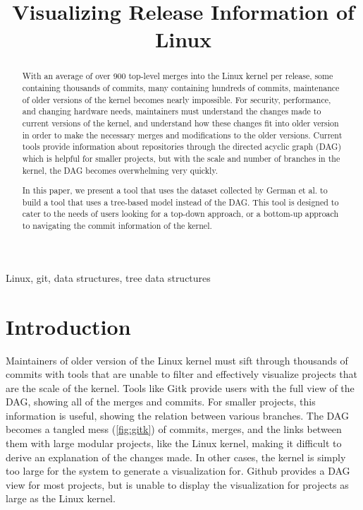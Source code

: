 \documentclass[conference, draftclsnofoot]{IEEEtran}
\makeatletter
\newcommand{\TheTitle}{Visualizing Release Information of Linux}
\newcommand{\TheAuthors}{Evan Wilde}
\newcommand{\TheEmails}{etcwilde@uvic.ca}
\newcommand{\TheKeywords}{Linux, git, data structures, tree data structures}
\makeatother
\begin{document}
\title{\TheTitle}
\author{
\IEEEauthorblockA{\TheAuthors}
\IEEEauthorblockA{Email: \TheEmails}
}
\maketitle
\begin{abstract}
	With an average of over 900 top-level merges into the Linux kernel per
	release, some containing thousands of commits, many containing hundreds
	of commits, maintenance of older versions of the kernel becomes nearly
	impossible. For security, performance, and changing hardware needs,
	maintainers must understand the changes made to current versions of the
	kernel, and understand how these changes fit into older version in
        order to make the necessary merges and modifications to the older
        versions. Current tools provide information about repositories through
        the directed acyclic graph (DAG) which is helpful for smaller projects,
        but with the scale and number of branches in the kernel, the DAG
        becomes overwhelming very quickly.

	In this paper, we present a tool that uses the dataset collected by
	German et al. to build a tool that uses a tree-based model instead of
        the DAG. This tool is designed to cater to the needs of users looking
        for a top-down approach, or a bottom-up approach to navigating the
        commit information of the kernel.
\end{abstract}

\begin{IEEEkeywords}
\TheKeywords
\end{IEEEkeywords}

\section{Introduction}

Maintainers of older version of the Linux kernel must sift through thousands of
commits with tools that are unable to filter and effectively visualize projects
that are the scale of the kernel. Tools like Gitk provide users with the
full view of the DAG, showing all of the merges and commits. For smaller
projects, this information is useful, showing the relation between various
branches. The DAG becomes a tangled mess (\ref{fig:gitk}) of commits, merges,
and the links between them with large modular projects, like the Linux kernel,
making it difficult to derive an explanation of the changes made. In other
cases, the kernel is simply too large for the system to generate a
visualization for. Github provides a DAG view for most projects, but is unable
to display the visualization for projects as large as the Linux kernel.
\end{document}
